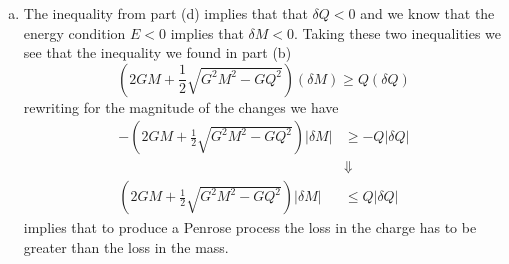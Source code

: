 \documentclass[11pt]{article}
\numberwithin{equation}{section}
\begin{document}
\begin{enumerate}[(a)]
\item
The inequality from part (d) implies that that $\delta Q < 0$ and we know that the energy condition $E<0$ implies that $\delta M <0$. Taking these two inequalities we see that the inequality we found in part (b) 
$$\left(2GM  + \frac{1}{2}\sqrt{G^2M^2-GQ^2}\right)(\delta M) \ge Q(\delta Q)$$
rewriting for the magnitude of the changes we have
\begin{align*}
-\left(2GM  + \frac{1}{2}\sqrt{G^2M^2-GQ^2}\right)|\delta M| &\ge -Q|\delta Q|\\
&\Downarrow\\
\left(2GM  + \frac{1}{2}\sqrt{G^2M^2-GQ^2}\right)|\delta M| &\le Q|\delta Q|
\end{align*}
implies that to produce a Penrose process the loss in the charge has to be greater than the loss in the mass.
\end{enumerate}
\end{document}
